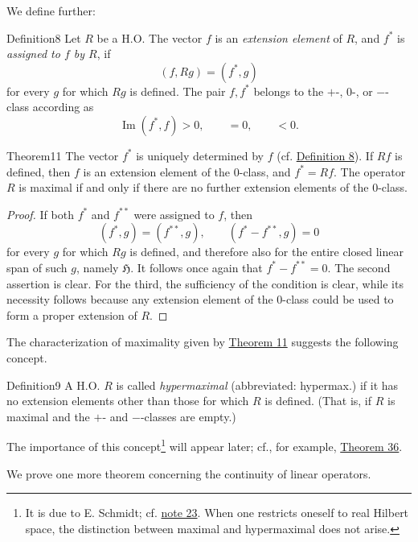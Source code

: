 ﻿\documentclass[paper=b5,fontsize=13pt,bookmarkpackage=false,twoside]{scrartcl}
\begin{document}
We define further:

\begin{namedstatement}{Definition}{8}\label{def:8}
Let $R$ be a H.O. The vector $f$ is an \emph{extension element} of $R$, and $f^*$ is \emph{assigned to $f$ by $R$}, if
\[
(f,Rg)=(f^*,g)
\]
for every $g$ for which $Rg$ is defined. The pair $f,f^*$ belongs to the $+$-, $0$-, or $-$-class according as
\[
\operatorname{Im}(f^*,f)>0,\qquad =0,\qquad <0.
\]
\end{namedstatement}

\begin{namedstatement}{Theorem}{11}\label{thm:11}
The vector $f^*$ is uniquely determined by $f$ (cf. \hyperref[def:8]{Definition 8}). If $Rf$ is defined, then $f$ is an extension element of the $0$-class, and $f^*=Rf$. The operator $R$ is maximal if and only if there are no further extension elements of the $0$-class.
\end{namedstatement}

\begin{proof}
If both $f^*$ and $f^{**}$ were assigned to $f$, then
\[
(f^*,g)=(f^{**},g),\qquad (f^*-f^{**},g)=0
\]
for every $g$ for which $Rg$ is defined, and therefore also for the entire closed linear span of such $g$, namely $\mathfrak H$. It follows once again that $f^*-f^{**}=0$. The second assertion is clear. For the third, the sufficiency of the condition is clear, while its necessity follows because any extension element of the $0$-class could be used to form a proper extension of $R$.
\end{proof}

The characterization of maximality given by \hyperref[thm:11]{Theorem 11} suggests the following concept.

\begin{namedstatement}{Definition}{9}\label{def:9}
A H.O. $R$ is called \emph{hypermaximal} (abbreviated: hypermax.) if it has no extension elements other than those for which $R$ is defined. (That is, if $R$ is maximal and the $+$- and $-$-classes are empty.)
\end{namedstatement}

The importance of this concept\footnote{\label{fn:31}It is due to E. Schmidt; cf. \hyperref[fn:source-23]{note 23}. When one restricts oneself to real Hilbert space, the distinction between maximal and hypermaximal does not arise.} will appear later; cf., for example, \hyperref[thm:36]{Theorem 36}.

We prove one more theorem concerning the continuity of linear operators.
\end{document}
